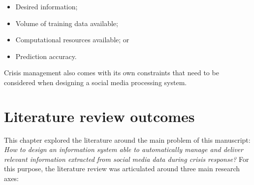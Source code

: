 \begin{itemize}
    \item Desired information;
    \item Volume of training data available;
    \item Computational resources available; or
    \item Prediction accuracy.
\end{itemize}

Crisis management also comes with its own constraints that need to be considered when designing a social media processing system.

\section{Literature review outcomes}
This chapter explored the literature around the main problem of this manuscript:
\emph{How to design an information system able to automatically manage and deliver relevant information extracted from social media data during crisis response?}
For this purpose, the literature review was articulated around three main research axes:

